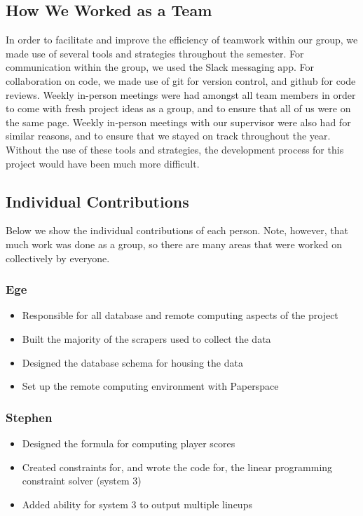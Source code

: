 \subsection{How We Worked as a Team}
In order to facilitate and improve the efficiency of teamwork within our group, we made use of several tools and strategies throughout the semester. For communication within the group, we used the Slack messaging app. For collaboration on code, we made use of git for version control, and github for code reviews. Weekly in-person meetings were had amongst all team members in order to come with fresh project ideas as a group, and to ensure that all of us were on the same page. Weekly in-person meetings with our supervisor were also had for similar reasons, and to ensure that we stayed on track throughout the year. Without the use of these tools and strategies, the development process for this project would have been much more difficult.

\subsection{Individual Contributions}
Below we show the individual contributions of each person. Note, however, that much work was done as a group, so there are many areas that were worked on collectively by everyone.

\subsubsection{Ege}
\begin{itemize}
  \item Responsible for all database and remote computing aspects of the project
  \item Built the majority of the scrapers used to collect the data
  \item Designed the database schema for housing the data
  \item Set up the remote computing environment with Paperspace \end{itemize}
\subsubsection{Stephen}
\begin{itemize}
  \item Designed the formula for computing player scores
  \item Created constraints for, and wrote the code for, the linear programming constraint solver (system 3)
  \item Added ability for system 3 to output multiple lineups
\end{itemize}
